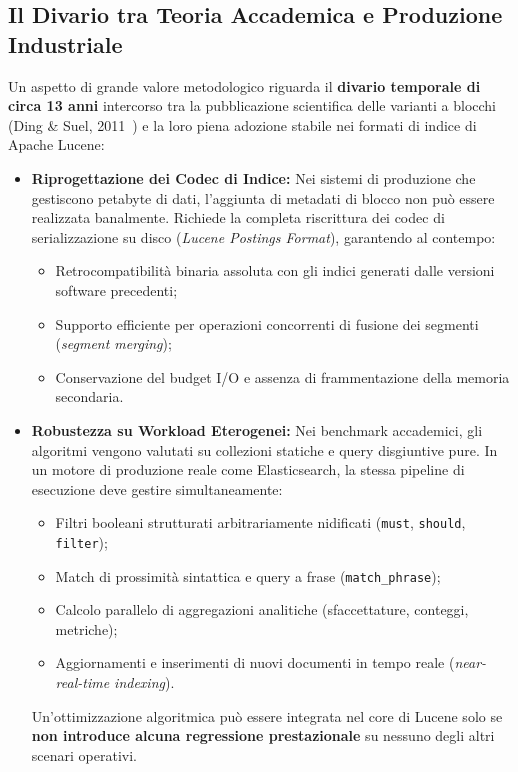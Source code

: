 \subsection{Il Divario tra Teoria Accademica e Produzione Industriale}
Un aspetto di grande valore metodologico riguarda il \textbf{divario temporale di circa 13 anni} intercorso tra la pubblicazione scientifica delle varianti a blocchi (Ding \& Suel, 2011~\cite{ding2011}) e la loro piena adozione stabile nei formati di indice di Apache Lucene:
\begin{itemize}
    \item \textbf{Riprogettazione dei Codec di Indice:} Nei sistemi di produzione che gestiscono petabyte di dati, l'aggiunta di metadati di blocco non pu\`o essere realizzata banalmente. Richiede la completa riscrittura dei codec di serializzazione su disco (\textit{Lucene Postings Format}), garantendo al contempo:
    \begin{itemize}
        \item Retrocompatibilit\`a binaria assoluta con gli indici generati dalle versioni software precedenti;
        \item Supporto efficiente per operazioni concorrenti di fusione dei segmenti (\textit{segment merging});
        \item Conservazione del budget I/O e assenza di frammentazione della memoria secondaria.
    \end{itemize}
    \item \textbf{Robustezza su Workload Eterogenei:} Nei benchmark accademici, gli algoritmi vengono valutati su collezioni statiche e query disgiuntive pure. In un motore di produzione reale come Elasticsearch, la stessa pipeline di esecuzione deve gestire simultaneamente:
    \begin{itemize}
        \item Filtri booleani strutturati arbitrariamente nidificati (\texttt{must}, \texttt{should}, \texttt{filter});
        \item Match di prossimit\`a sintattica e query a frase (\texttt{match\_phrase});
        \item Calcolo parallelo di aggregazioni analitiche (sfaccettature, conteggi, metriche);
        \item Aggiornamenti e inserimenti di nuovi documenti in tempo reale (\textit{near-real-time indexing}).
    \end{itemize}
    Un'ottimizzazione algoritmica pu\`o essere integrata nel core di Lucene solo se \textbf{non introduce alcuna regressione prestazionale} su nessuno degli altri scenari operativi.
\end{itemize}

